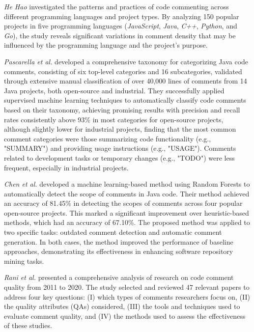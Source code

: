 \noindent \textit{He Hao} \cite{HaoHe19} investigated the patterns and practices of code commenting across different programming languages and project types. By analyzing 150 popular projects in five programming languages (\textit{JavaScript}, \textit{Java}, \textit{C++}, \textit{Python}, and \textit{Go}), the study reveals significant variations in comment density that may be influenced by the programming language and the project's purpose.

\noindent \textit{Pascarella et al.} \cite{javaCmsClassification} developed a comprehensive taxonomy for categorizing Java code comments, consisting of six top-level categories and 16 subcategories, validated through extensive manual classification of over 40,000 lines of comments from 14 Java projects, both open-source and industrial. They successfully applied supervised machine learning techniques to automatically classify code comments based on their taxonomy, achieving promising results with precision and recall rates consistently above 93\% in most categories for open-source projects, although slightly lower for industrial projects, finding that the most common comment categories were those summarizing code functionality (e.g., "SUMMARY") and providing usage instructions (e.g., "USAGE"). Comments related to development tasks or temporary changes (e.g., "TODO") were less frequent, especially in industrial projects.

\noindent \textit{Chen et al.} \cite{CHEN201945} developed a machine learning-based method using Random Forests to automatically detect the scope of comments in Java code. Their method achieved an accuracy of 81.45\% in detecting the scopes of comments across four popular open-source projects. This marked a significant improvement over heuristic-based methods, which had an accuracy of 67.10\%. The proposed method was applied to two specific tasks: outdated comment detection and automatic comment generation. In both cases, the method improved the performance of baseline approaches, demonstrating its effectiveness in enhancing software repository mining tasks.

\noindent \textit{Rani et al.}\cite{Rani2023} presented a comprehensive analysis of research on code comment quality from 2011 to 2020. The study selected and reviewed 47 relevant papers to address four key questions: (I) which types of comments researchers focus on, (II) the quality attributes (QAs) considered, (III) the tools and techniques used to evaluate comment quality, and (IV) the methods used to assess the effectiveness of these studies.